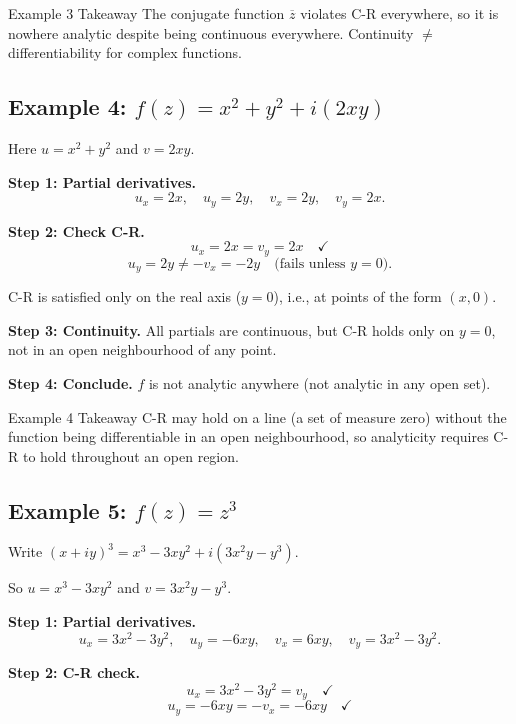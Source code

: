\documentclass[12pt,a4paper]{article}
\begin{document}
\begin{learnbox}{Example 3 Takeaway}
The conjugate function $\overline{z}$ violates C-R everywhere, so it is nowhere analytic despite being continuous everywhere. Continuity $\neq$ differentiability for complex functions.
\end{learnbox}

\subsection*{Example 4: $f(z) = x^2 + y^2 + i(2xy)$}

Here $u = x^2 + y^2$ and $v = 2xy$.

\textbf{Step 1: Partial derivatives.}
\[
  u_x = 2x, \quad u_y = 2y, \quad v_x = 2y, \quad v_y = 2x.
\]

\textbf{Step 2: Check C-R.}
\[
  u_x = 2x = v_y = 2x \quad \checkmark
\]
\[
  u_y = 2y \neq -v_x = -2y \quad \text{(fails unless } y = 0\text{)}.
\]

C-R is satisfied only on the real axis ($y = 0$), i.e., at points of the form $(x, 0)$.

\textbf{Step 3: Continuity.}
All partials are continuous, but C-R holds only on $y=0$, not in an open neighbourhood of any point.

\textbf{Step 4: Conclude.}
$f$ is not analytic anywhere (not analytic in any open set).

\begin{learnbox}{Example 4 Takeaway}
C-R may hold on a line (a set of measure zero) without the function being differentiable in an open neighbourhood, so analyticity requires C-R to hold throughout an open region.
\end{learnbox}

\subsection*{Example 5: $f(z) = z^3$}

Write $(x+iy)^3 = x^3 - 3xy^2 + i(3x^2y - y^3)$.

So $u = x^3 - 3xy^2$ and $v = 3x^2y - y^3$.

\textbf{Step 1: Partial derivatives.}
\[
  u_x = 3x^2 - 3y^2, \quad u_y = -6xy, \quad v_x = 6xy, \quad v_y = 3x^2 - 3y^2.
\]

\textbf{Step 2: C-R check.}
\[
  u_x = 3x^2-3y^2 = v_y \quad \checkmark
\]
\[
  u_y = -6xy = -v_x = -6xy \quad \checkmark
\]
\end{document}

